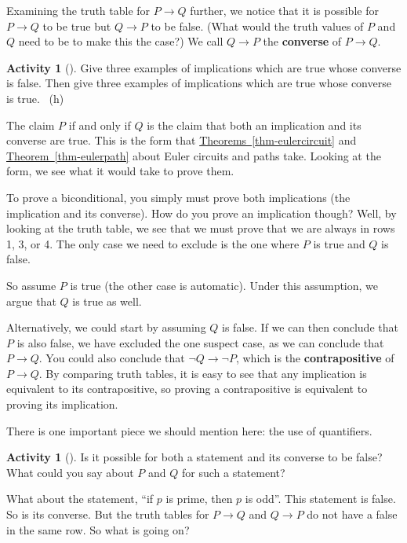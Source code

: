 \documentclass[10pt,]{book}
\newcommand{\terminology}[1]{\textbf{#1}}
\theoremstyle{plain}
\theoremstyle{definition}
\theoremstyle{definition}
\theoremstyle{definition}
\newtheorem{activity}[project]{Activity}
\numberwithin{equation}{chapter}
\def\imp{\rightarrow}
\begin{document}
\hypertarget{p-166}{}%
Examining the truth table for \(P \imp Q\) further, we notice that it is possible for \(P \imp Q\) to be true but \(Q \imp P\) to be false. (What would the truth values of \(P\) and \(Q\) need to be to make this the case?) We call \(Q \imp P\) the \terminology{converse} of \(P \imp Q\).%
\begin{activity}[]\label{activity-8}
\hypertarget{p-167}{}%
Give three examples of implications which are true whose converse is false.  Then give three examples of implications which are true whose converse is true.%
~{\tiny (h)}\end{activity}
\hypertarget{p-169}{}%
The claim \(P\) if and only if \(Q\) is the claim that both an implication and its converse are true.  This is the form that \hyperref[thm-eulercircuit]{Theorems~\ref{thm-eulercircuit}} and \hyperref[thm-eulerpath]{Theorem~\ref{thm-eulerpath}} about Euler circuits and paths take.  Looking at the form, we see what it would take to prove them.%
\par
\hypertarget{p-170}{}%
To prove a biconditional, you simply must prove both implications (the implication and its converse).  How do you prove an implication though?  Well, by looking at the truth table, we see that we must prove that we are always in rows 1, 3, or 4.  The only case we need to exclude is the one where \(P\) is true and \(Q\) is false.%
\par
\hypertarget{p-171}{}%
So assume \(P\) is true (the other case is automatic).  Under this assumption, we argue that \(Q\) is true as well.%
\par
\hypertarget{p-172}{}%
Alternatively, we could start by assuming \(Q\) is false.  If we can then conclude that \(P\) is also false, we have excluded the one suspect case, as we can conclude that \(P \imp Q\).  You could also conclude that \(\neg Q \imp \neg P\), which is the \terminology{contrapositive} of \(P \imp Q\).  By comparing truth tables, it is easy to see that any implication is equivalent to its contrapositive, so proving a contrapositive is equivalent to proving its implication.%
\par
\hypertarget{p-173}{}%
There is one important piece we should mention here: the use of quantifiers.%
\begin{activity}[]\label{activity-9}
\hypertarget{p-174}{}%
Is it possible for both a statement and its converse to be false?  What could you say about \(P\) and \(Q\) for such a statement?%
\end{activity}
\hypertarget{p-175}{}%
What about the statement, ``if \(p\) is prime, then \(p\) is odd''.  This statement is false.  So is its converse.  But the truth tables for \(P \imp Q\) and \(Q \imp P\) do not have a false in the same row.  So what is going on?%
\end{document}
